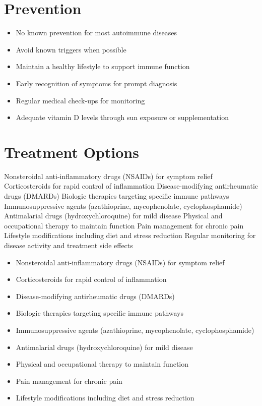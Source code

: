 \section{Prevention}
\begin{itemize}[noitemsep]
  \item No known prevention for most autoimmune diseases
  \item Avoid known triggers when possible
  \item Maintain a healthy lifestyle to support immune function
  \item Early recognition of symptoms for prompt diagnosis
  \item Regular medical check-ups for monitoring
  \item Adequate vitamin D levels through sun exposure or supplementation
\end{itemize}
\section{Treatment Options}
Nonsteroidal anti-inflammatory drugs (NSAIDs) for symptom relief Corticosteroids for rapid control of inflammation Disease-modifying antirheumatic drugs (DMARDs) Biologic therapies targeting specific immune pathways Immunosuppressive agents (azathioprine, mycophenolate, cyclophosphamide) Antimalarial drugs (hydroxychloroquine) for mild disease Physical and occupational therapy to maintain function Pain management for chronic pain Lifestyle modifications including diet and stress reduction Regular monitoring for disease activity and treatment side effects

\begin{itemize}[noitemsep]
  \item Nonsteroidal anti-inflammatory drugs (NSAIDs) for symptom relief
  \item Corticosteroids for rapid control of inflammation
  \item Disease-modifying antirheumatic drugs (DMARDs)
  \item Biologic therapies targeting specific immune pathways
  \item Immunosuppressive agents (azathioprine, mycophenolate, cyclophosphamide)
  \item Antimalarial drugs (hydroxychloroquine) for mild disease
  \item Physical and occupational therapy to maintain function
  \item Pain management for chronic pain
  \item Lifestyle modifications including diet and stress reduction
\end{itemize}
